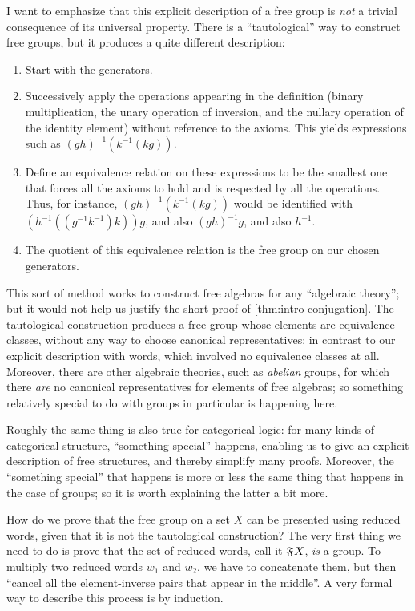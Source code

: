 I want to emphasize that this explicit description of a free group is \emph{not} a trivial consequence of its universal property.
There is a ``tautological'' way to construct free groups, but it produces a quite different description:
\begin{enumerate}
\item Start with the generators.
\item Successively apply the operations appearing in the definition (binary multiplication, the unary operation of inversion, and the nullary operation of the identity element) without reference to the axioms.
  This yields expressions such as $(g h)^{-1}(k^{-1} (k g))$.
\item Define an equivalence relation on these expressions to be the smallest one that forces all the axioms to hold and is respected by all the operations.
  Thus, for instance, $(g h)^{-1}(k^{-1} (k g))$ would be identified with $(h^{-1} ((g^{-1} k^{-1}) k)) g$, and also $(g h)^{-1} g$, and also $h^{-1}$.
\item The quotient of this equivalence relation is the free group on our chosen generators.
\end{enumerate}

This sort of method works to construct free algebras for any ``algebraic theory''; but it would not help us justify the short proof of \cref{thm:intro-conjugation}.
The tautological construction produces a free group whose elements are equivalence classes, without any way to choose canonical representatives; in contrast to our explicit description with words, which involved no equivalence classes at all.
Moreover, there are other algebraic theories, such as \emph{abelian} groups, for which there \emph{are} no canonical representatives for elements of free algebras; so something relatively special to do with groups in particular is happening here.

Roughly the same thing is also true for categorical logic: for many kinds of categorical structure, ``something special'' happens, enabling us to give an explicit description of free structures, and thereby simplify many proofs.
Moreover, the ``something special'' that happens is more or less the same thing that happens in the case of groups; so it is worth explaining the latter a bit more.

How do we prove that the free group on a set $X$ can be presented using reduced words, given that it is not the tautological construction?
The very first thing we need to do is prove that the set of reduced words, call it $\mathfrak{F}_{}X$, \emph{is} a group.
To multiply two reduced words $w_1$ and $w_2$, we have to concatenate them, but then ``cancel all the element-inverse pairs that appear in the middle''.
A very formal way to describe this process is by induction.

